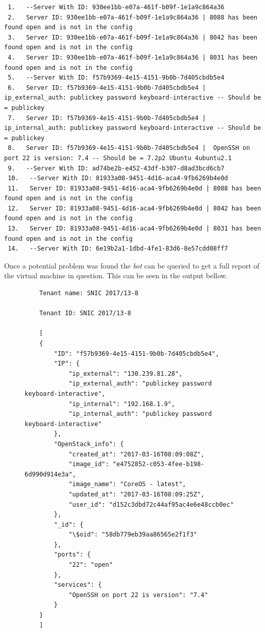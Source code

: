 \documentclass[12pt]{article}
\begin{document}
\begin{mdframed}
\begin{lstlisting}
 1.   --Server With ID: 930ee1bb-e07a-461f-b09f-1e1a9c864a36
 2.   Server ID: 930ee1bb-e07a-461f-b09f-1e1a9c864a36 | 8088 has been found open and is not in the config
 3.   Server ID: 930ee1bb-e07a-461f-b09f-1e1a9c864a36 | 8042 has been found open and is not in the config
 4.   Server ID: 930ee1bb-e07a-461f-b09f-1e1a9c864a36 | 8031 has been found open and is not in the config
 5.   --Server With ID: f57b9369-4e15-4151-9b0b-7d405cbdb5e4
 6.   Server ID: f57b9369-4e15-4151-9b0b-7d405cbdb5e4 |  ip_external_auth: publickey password keyboard-interactive -- Should be = publickey
 7.   Server ID: f57b9369-4e15-4151-9b0b-7d405cbdb5e4 |  ip_internal_auth: publickey password keyboard-interactive -- Should be = publickey
 8.   Server ID: f57b9369-4e15-4151-9b0b-7d405cbdb5e4 |  OpenSSH on port 22 is version: 7.4 -- Should be = 7.2p2 Ubuntu 4ubuntu2.1
 9.   --Server With ID: ad74be2b-e452-43df-b307-d8ad3bcd6cb7
 10.   --Server With ID: 81933a08-9451-4d16-aca4-9fb6269b4e0d
 11.   Server ID: 81933a08-9451-4d16-aca4-9fb6269b4e0d | 8088 has been found open and is not in the config
 12.   Server ID: 81933a08-9451-4d16-aca4-9fb6269b4e0d | 8042 has been found open and is not in the config
 13.   Server ID: 81933a08-9451-4d16-aca4-9fb6269b4e0d | 8031 has been found open and is not in the config
 14.   --Server With ID: 6e19b2a1-1dbd-4fe1-83d6-8e57cdd08ff7
\end{lstlisting}
\end{mdframed}

\newpage
Once a potential problem was found the \emph{bot} can be queried to get a full report of the virtual machine in question. This can be seen in the output bellow.

\begin{figure}[H]
\begin{mdframed}
\begin{lstlisting}
    Tenant name: SNIC 2017/13-8

    Tenant ID: SNIC 2017/13-8

    [
    {
        "ID": "f57b9369-4e15-4151-9b0b-7d405cbdb5e4",
        "IP": {
            "ip_external": "130.239.81.28",
            "ip_external_auth": "publickey password keyboard-interactive",
            "ip_internal": "192.168.1.9",
            "ip_internal_auth": "publickey password keyboard-interactive"
        },
        "OpenStack_info": {
            "created_at": "2017-03-16T08:09:08Z",
            "image_id": "e4752852-c053-4fee-b198-6d990d914e3a",
            "image_name": "CoreOS - latest",
            "updated_at": "2017-03-16T08:09:25Z",
            "user_id": "d152c3dbd72c44af95ac4e6e48ccb0ec"
        },
        "_id": {
            "\$oid": "58db779eb39aa86565e2f1f3"
        },
        "ports": {
            "22": "open"
        },
        "services": {
            "OpenSSH on port 22 is version": "7.4"
        }
    }
    ]
\end{lstlisting}
\end{mdframed}
\end{figure}
\end{document}

